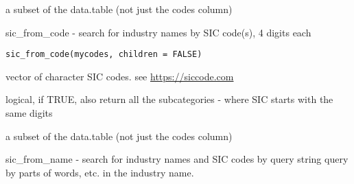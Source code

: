 \documentclass[a4paper]{book}
\begin{document}
%
\begin{Value}
a subset of the  data.table (not just the codes column)
\end{Value}
%
\begin{SeeAlso}\relax
{}     
\end{SeeAlso}
%
\begin{Description}\relax
sic\_from\_code - search for industry names by SIC code(s), 4 digits each
\end{Description}
%
\begin{Usage}
\begin{verbatim}
sic_from_code(mycodes, children = FALSE)
\end{verbatim}
\end{Usage}
%
\begin{Arguments}
\begin{ldescription}
\item[\code{mycodes}] vector of character SIC codes. see \url{https://siccode.com}

\item[\code{children}] logical, if TRUE, also return all the subcategories - where SIC starts with the same digits
\end{ldescription}
\end{Arguments}
%
\begin{Value}
a subset of the  data.table (not just the codes column)
\end{Value}
%
\begin{SeeAlso}\relax
{}   
\end{SeeAlso}
%
\begin{Description}\relax
sic\_from\_name - search for industry names and SIC codes by query string
query by parts of words, etc. in the industry name.
\end{Description}
\end{document}
